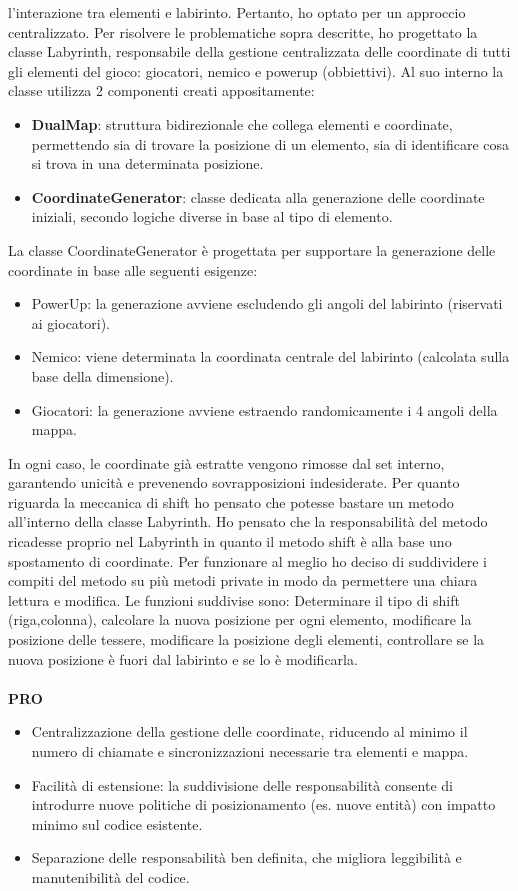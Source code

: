 \documentclass[a4paper,12pt]{report}
\begin{document}
l’interazione tra elementi e labirinto. Pertanto, ho optato per un approccio centralizzato.
Per risolvere le problematiche sopra descritte, ho progettato la classe Labyrinth, 
responsabile della gestione centralizzata delle coordinate di tutti gli elementi del gioco: giocatori, nemico e powerup (obbiettivi).
Al suo interno la classe utilizza 2 componenti creati appositamente:
\begin{itemize}
	\item \textbf{DualMap}: struttura bidirezionale che collega elementi e coordinate, permettendo sia di trovare la posizione di un elemento, 
	sia di identificare cosa si trova in una determinata posizione.
	\item \textbf{CoordinateGenerator}: classe dedicata alla generazione delle coordinate iniziali, secondo logiche diverse in base al tipo di elemento.
\end{itemize}
La classe CoordinateGenerator è progettata per supportare la generazione delle coordinate in base alle seguenti esigenze:
\begin{itemize}
	\item PowerUp: la generazione avviene escludendo gli angoli del labirinto (riservati ai giocatori).
	\item Nemico: viene determinata la coordinata centrale del labirinto (calcolata sulla base della dimensione).
	\item Giocatori: la generazione avviene estraendo randomicamente i 4 angoli della mappa.
\end{itemize}
In ogni caso, le coordinate già estratte vengono rimosse dal set interno, garantendo unicità e prevenendo sovrapposizioni indesiderate.
Per quanto riguarda la meccanica di shift ho pensato che potesse bastare un metodo all'interno della classe Labyrinth.
Ho pensato che la responsabilità del metodo ricadesse proprio nel Labyrinth in quanto il metodo shift è alla base uno spostamento di coordinate.
Per funzionare al meglio ho deciso di suddividere i compiti del metodo su più metodi private in modo da permettere una chiara lettura e modifica.
Le funzioni suddivise sono: Determinare il tipo di shift (riga,colonna), calcolare la nuova posizione per ogni elemento, modificare la posizione delle tessere, modificare la posizione degli elementi,
controllare se la nuova posizione è fuori dal labirinto e se lo è modificarla.
\\
\\
\textbf{PRO}
\begin{itemize}
	\item Centralizzazione della gestione delle coordinate, riducendo al minimo il numero di chiamate e sincronizzazioni necessarie tra elementi e mappa.
	\item Facilità di estensione: la suddivisione delle responsabilità consente di introdurre nuove politiche di posizionamento (es. nuove entità) con impatto minimo sul codice esistente.
	\item Separazione delle responsabilità ben definita, che migliora leggibilità e manutenibilità del codice.
\end{itemize}
\end{document}
